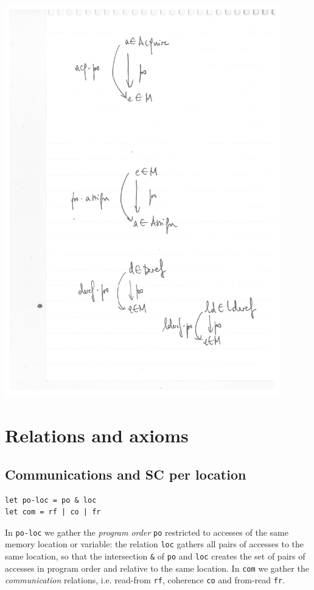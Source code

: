 \documentclass[a4paper]{article}
\begin{document}
\includegraphics[width=12cm]{acq-po}

\section{Relations and axioms}

\subsection{Communications and SC per location}

\begin{verbatim}
let po-loc = po & loc
let com = rf | co | fr
\end{verbatim}

In {\tt po-loc} we gather the \emph{program order} {\tt po} restricted to
accesses of the same memory location or variable: the relation {\tt loc}
gathers all pairs of accesses to the same location, so that the intersection
{\tt \&} of {\tt po} and {\tt loc} creates the set of pairs of accesses in
program order and relative to the same location. In {\tt com} we gather the
\emph{communication} relations, i.e. read-from {\tt rf}, coherence {\tt co} and
from-read {\tt fr}.
\end{document}
